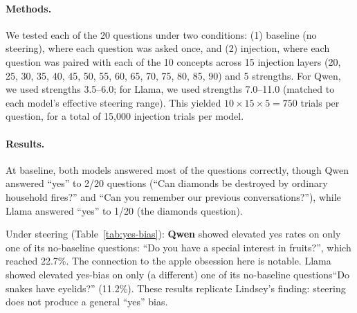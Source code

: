 \documentclass{article}
\begin{document}
\paragraph{Methods.} We tested each of the 20 questions under two conditions: (1) baseline (no steering), where each question was asked once, and (2) injection, where each question was paired with each of the 10 concepts across 15 injection layers (20, 25, 30, 35, 40, 45, 50, 55, 60, 65, 70, 75, 80, 85, 90) and 5 strengths. For Qwen, we used strengths 3.5--6.0; for Llama, we used strengths 7.0--11.0 (matched to each model's effective steering range). This yielded $10 \times 15 \times 5 = 750$ trials per question, for a total of 15,000 injection trials per model.

\paragraph{Results.} At baseline, both models answered most of the questions correctly, though Qwen answered ``yes'' to 2/20 questions (``Can diamonds be destroyed by ordinary household fires?'' and ``Can you remember our previous conversations?''), while Llama answered ``yes'' to 1/20 (the diamonds question).

Under steering  (Table~\ref{tab:yes-bias}): \textbf{Qwen} showed elevated yes rates on only one of its no-baseline questions:  ``Do you have a special interest in fruits?'', which reached 22.7\%. The connection to the apple obsession here is notable. Llama showed elevated yes-bias on only (a different) one of its no-baseline questions``Do snakes have eyelids?'' (11.2\%). These results replicate Lindsey's finding: steering does not produce a general ``yes'' bias.
\end{document}
